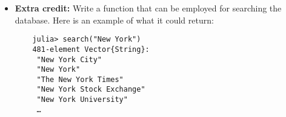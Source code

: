 \begin{exercise}
\begin{itemize}
            After you have assigned a rank to all the pages,
            print the 10 pages with the highest ranks.
            My code returns the following entries:
            \begin{multicols}{3}
                \begin{enumerate}
                    \item United States
                    \item United Kingdom
                    \item World War~II
                    \item Latin
                    \item France
                    \item Germany
                    \item English language
                    \item China
                    \item Canada
                    \item India
                \end{enumerate}
            \end{multicols}
        \item
            \textbf{Extra credit:}
            Write a function  that can be employed for searching the database.
            Here is an example of what it could return:

    \begin{verbatim}
    julia> search("New York")
    481-element Vector{String}:
     "New York City"
     "New York"
     "The New York Times"
     "New York Stock Exchange"
     "New York University"
     …
    \end{verbatim}
    \end{itemize}
\end{exercise}

